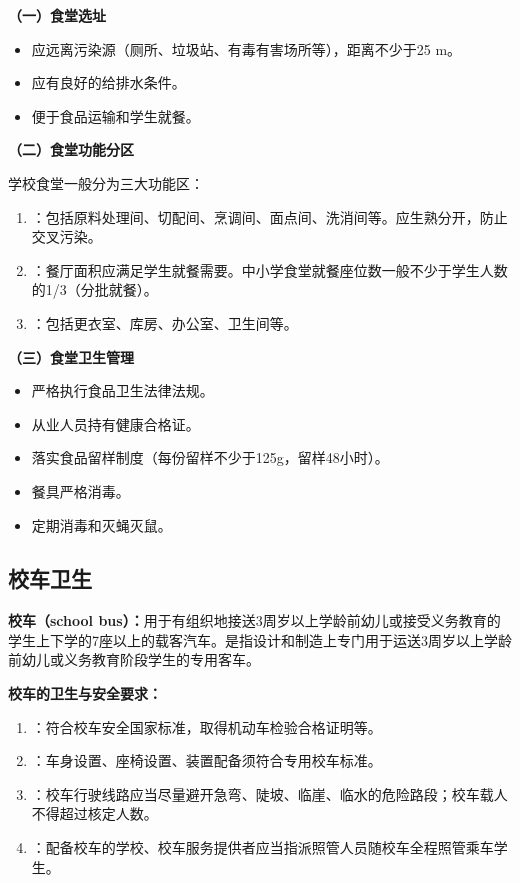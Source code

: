 \begin{keybox}
\textbf{（一）食堂选址}

\begin{itemize}[leftmargin=*]
    \item 应远离污染源（厕所、垃圾站、有毒有害场所等），距离不少于25 m。
    \item 应有良好的给排水条件。
    \item 便于食品运输和学生就餐。
\end{itemize}

\textbf{（二）食堂功能分区}

学校食堂一般分为三大功能区：

\begin{enumerate}[leftmargin=*]
    \item {}：包括原料处理间、切配间、烹调间、面点间、洗消间等。应生熟分开，防止交叉污染。
    \item {}：餐厅面积应满足学生就餐需要。中小学食堂就餐座位数一般不少于学生人数的1/3（分批就餐）。
    \item {}：包括更衣室、库房、办公室、卫生间等。
\end{enumerate}

\textbf{（三）食堂卫生管理}

\begin{itemize}[leftmargin=*]
    \item 严格执行食品卫生法律法规。
    \item 从业人员持有健康合格证。
    \item 落实食品留样制度（每份留样不少于125g，留样48小时）。
    \item 餐具严格消毒。
    \item 定期消毒和灭蝇灭鼠。
\end{itemize}
\end{keybox}
\subsection{校车卫生}

\begin{keybox}
\textbf{校车（school bus）：}用于有组织地接送3周岁以上学龄前幼儿或接受义务教育的学生上下学的7座以上的载客汽车。是指设计和制造上专门用于运送3周岁以上学龄前幼儿或义务教育阶段学生的专用客车。

\textbf{校车的卫生与安全要求：}
\begin{enumerate}[leftmargin=*]
    \item {}：符合校车安全国家标准，取得机动车检验合格证明等。
    \item {}：车身设置、座椅设置、装置配备须符合专用校车标准。
    \item {}：校车行驶线路应当尽量避开急弯、陡坡、临崖、临水的危险路段；校车载人不得超过核定人数。
    \item {}：配备校车的学校、校车服务提供者应当指派照管人员随校车全程照管乘车学生。
\end{enumerate}
\end{keybox}

